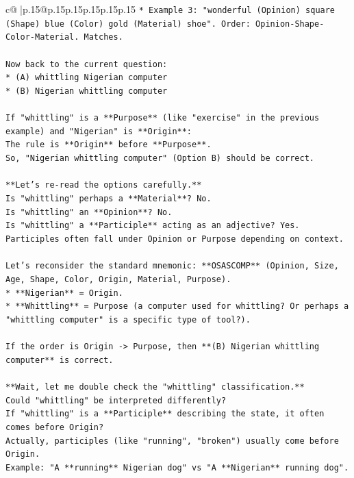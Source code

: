 \documentclass{article}
\begin{document}
{\begin{supertabular}{c@{$\;$}|p{.15\linewidth}@{}p{.15\linewidth}p{.15\linewidth}p{.15\linewidth}p{.15\linewidth}p{.15\linewidth}}
{{{\texttt{*   Example 3: "wonderful (Opinion) square (Shape) blue (Color) gold (Material) shoe". Order: Opinion{-}Shape{-}Color{-}Material. Matches.} \\
\\ 
\texttt{Now back to the current question:} \\
\texttt{*   (A) whittling Nigerian computer} \\
\texttt{*   (B) Nigerian whittling computer} \\
\\ 
\texttt{If "whittling" is a **Purpose** (like "exercise" in the previous example) and "Nigerian" is **Origin**:} \\
\texttt{The rule is **Origin** before **Purpose**.} \\
\texttt{So, "Nigerian whittling computer" (Option B) should be correct.} \\
\\ 
\texttt{**Let's re{-}read the options carefully.**} \\
\texttt{Is "whittling" perhaps a **Material**? No.} \\
\texttt{Is "whittling" an **Opinion**? No.} \\
\texttt{Is "whittling" a **Participle** acting as an adjective? Yes. Participles often fall under Opinion or Purpose depending on context.} \\
\\ 
\texttt{Let's reconsider the standard mnemonic: **OSASCOMP** (Opinion, Size, Age, Shape, Color, Origin, Material, Purpose).} \\
\texttt{*   **Nigerian** = Origin.} \\
\texttt{*   **Whittling** = Purpose (a computer used for whittling? Or perhaps a "whittling computer" is a specific type of tool?).} \\
\\ 
\texttt{If the order is Origin {-}> Purpose, then **(B) Nigerian whittling computer** is correct.} \\
\\ 
\texttt{**Wait, let me double check the "whittling" classification.**} \\
\texttt{Could "whittling" be interpreted differently?} \\
\texttt{If "whittling" is a **Participle** describing the state, it often comes before Origin?} \\
\texttt{Actually, participles (like "running", "broken") usually come before Origin.} \\
\texttt{Example: "A **running** Nigerian dog" vs "A **Nigerian** running dog".} \\
}}}
\end{supertabular}}
\end{document}
